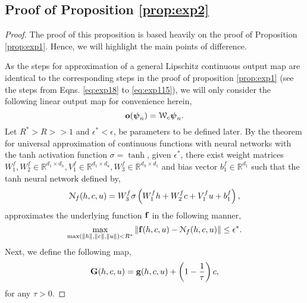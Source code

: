 \documentclass{article} \usepackage{iclr2022_conference,times}
\newcommand{\bc}{{\boldsymbol{\psi}}}
\newcommand{\bo}{{\bf o}}
\newcommand{\R}{{\mathbb R}}
\newcommand{\cN}{\EuScript{N}}
\newcommand{\bG}{{\bf G}}
\newcommand{\bif}{{\bf f}}
\newcommand{\bg}{{\bf g}}
\newcommand{\cW}{\EuScript{W}}
\begin{document}
\subsection{Proof of Proposition \ref{prop:exp2}}
\label{app:exp2pf}
\begin{proof}
The proof of this proposition is based heavily on the proof of Proposition \ref{prop:exp1}. Hence, we will highlight the main points of difference. 

As the steps for approximation of a general Lipschitz continuous output map are identical to the corresponding steps in the proof of proposition \ref{prop:exp1} (see the steps from Eqns. \eqref{eq:exp18} to \eqref{eq:exp115}), we will only consider the following linear output map for convenience herein, 
\begin{equation}
    \label{eq:exp02}
    \bo(\bc_n) =  \cW_{c}\bc_n.
\end{equation}
Let $R^{\ast} > R >> 1$ and $\epsilon^{\ast} < \epsilon$, be parameters to be defined later. By the theorem for universal approximation of continuous functions with neural networks with the tanh activation function $\sigma = \tanh$, given $\epsilon^{\ast}$, there exist weight matrices $W^f_1,W^f_2 \in \R^{d_1 \times d_h}, V^f_1 \in \R^{d_1\times d_u}, W^f_3 \in \R^{d_h \times d_1}$ and bias vector $b^f_1 \in \R^{d_1}$ such that the tanh neural network defined by,
\begin{equation}
\label{eq:nf}
\cN_f(h,c,u) = W^f_3\sigma\left(W^f_1 h + W^f_2c+ V^f_1 u + b^f_1 \right),
\end{equation}
approximates the underlying function $\bif$ in the following manner, 
\begin{equation}
    \label{eq:exp21}
    \max\limits_{\max(\|h\|,\|c\|,\|u\|)< R^{\ast}} \|\bif(h,c,u) - \cN_f(h,c,u) \| \leq \epsilon^{\ast}.
\end{equation}
Next, we define the following map, 
\begin{equation}
\label{eq:exp22}
\bG(h,c,u) = \bg(h,c,u) + \left(1-\frac{1}{\tau}\right)c,
\end{equation}
for any $\tau > 0$.


\end{proof}
\end{document}
